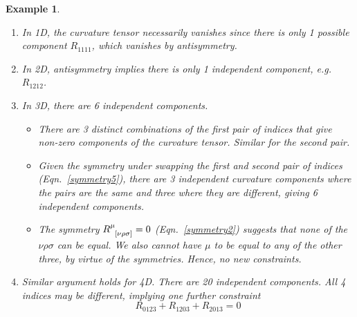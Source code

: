\documentclass[a4paper]{article}
\newtheorem{eg}{Example}[section]
\theoremstyle{new}
\begin{document}
\begin{eg}\leavevmode
\begin{enumerate}
    \item In 1D, the curvature tensor necessarily vanishes since there is only 1 possible component $R_{1111}$, which vanishes by antisymmetry.
    \item In 2D, antisymmetry implies there is only 1 independent component, e.g. $R_{1212}$.
    \item In 3D, there are 6 independent components.
    \begin{itemize}
        \item There are 3 distinct combinations of the first pair of indices that give non-zero components of the curvature tensor. Similar for the second pair.
        \item Given the symmetry under swapping the first and second pair of indices (Eqn.~\ref{symmetry5}), there are 3 independent curvature components where the pairs are the same and three where they are different, giving 6 independent components.
        \item The symmetry $\tensor*{R}{*_{}^{\mu}_{[\nu\rho\sigma]}}=0$ (Eqn.~\ref{symmetry2}) suggests that none of the $\nu\rho\sigma$ can be equal. We also cannot have $\mu$ to be equal to any of the other three, by virtue of the symmetries. Hence, no new constraints.
    \end{itemize}
    \item Similar argument holds for 4D. There are 20 independent components. All 4 indices may be different, implying one further constraint
    $$R_{0123}+R_{1203}+R_{2013}=0$$
\end{enumerate}

\end{eg}
\newpage
\end{document}
